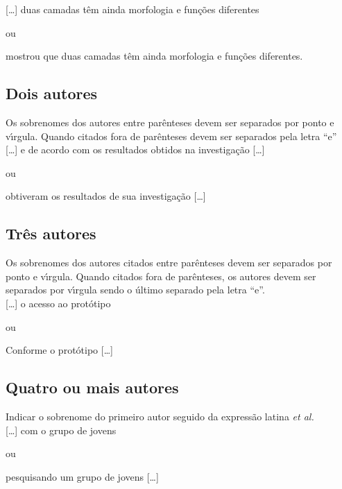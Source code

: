 [\ldots] duas camadas t\^em ainda morfologia e fun\c{c}\~oes diferentes \cite{Pereira2013}

ou

 mostrou que duas camadas t\^em ainda morfologia e fun\c{c}\~oes diferentes.\\


\subsection{Dois autores}

Os sobrenomes dos autores entre par\^enteses devem ser separados por ponto e v\'{\i}rgula. Quando citados fora de par\^enteses devem ser separados pela letra “e”\\

[\ldots] \cite{Ramos2014} e de acordo com os resultados obtidos na investiga\c{c}\~ao [\ldots] 

ou 

 obtiveram os resultados de sua investiga\c{c}\~ao [\ldots] \\

\subsection{Tr\^es autores}

Os sobrenomes dos autores citados entre par\^enteses devem ser separados por ponto e v\'{\i}rgula. Quando citados fora de par\^enteses, os autores devem ser separados por v\'{\i}rgula sendo o \'ultimo separado pela letra “e”.\\

[\ldots] o acesso ao prot\'otipo \cite{Oliveira2013}

ou

Conforme  o prot\'otipo [\ldots]\\

\subsection{Quatro ou mais autores}

Indicar o sobrenome do primeiro autor seguido da express\~ao latina \textit{et al.}\\

[\ldots]  com o grupo de jovens \cite{Sena2012}

ou

 pesquisando um grupo de jovens [\ldots]\\

